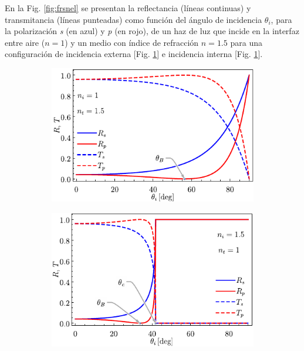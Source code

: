 En la Fig. \ref{fig:frsnel} se presentan la reflectancia (líneas continuas) y transmitancia (líneas punteadas) como función del ángulo de incidencia $\theta_i$, para la polarización \emph{s} (en azul) y \emph{p} (en rojo), de un haz de luz que incide en la interfaz entre aire ($n=1$) y un medio con índice de refracción $n=1.5$ para una configuración de incidencia externa [Fig. \ref{sfig:frsnelExt}] e incidencia interna [Fig. \ref{sfig:frsnelExt}].
%
\begin{figure}[h!]\centering\hspace*{-1.5em}
	\begin{subfigure}{.05\textwidth}\vspace{-4.5cm}\caption{}\label{sfig:frsnelExt}\end{subfigure}
	\begin{subfigure}{.43\textwidth} \hspace*{-.7cm}
	\includegraphics[scale=1]{1-Teoria/figs/1-2-FrsnelExt}
	\end{subfigure}
	\begin{subfigure}{.05\textwidth}\vspace{-4.5cm}\caption{}\label{sfig:frsenlInt}\end{subfigure}
	\begin{subfigure}{.43\textwidth} \hspace*{-.7cm}
	\includegraphics[scale=1]{1-Teoria/figs/1-2-FrsnelInt}

\end{subfigure}
\end{figure}
